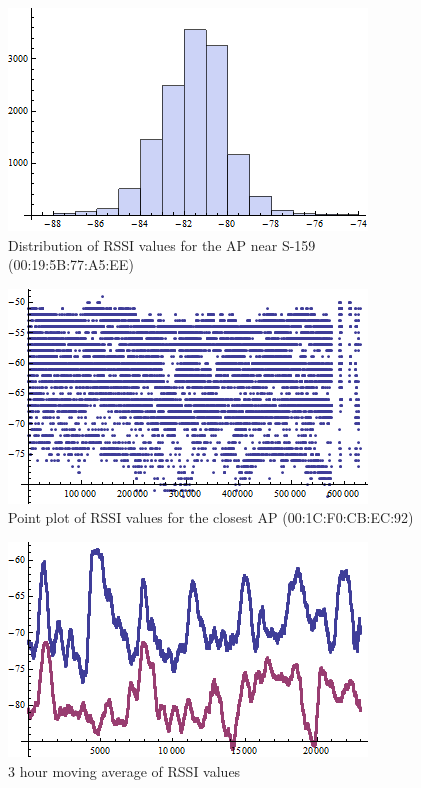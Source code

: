 \begin{figure}\centering
    \includegraphics{figures/histogram_00_19_5B_77_A5_EE.png}
    \caption{Distribution of RSSI values for the AP near S-159 (00:19:5B:77:A5:EE) \label{fig:histogram_00_19_5B_77_A5_EE}}
\end{figure}

\begin{figure}\centering
    \includegraphics{figures/listplot_00_1C_F0_CB_EC_92.png}
    \caption{Point plot of RSSI values for the closest AP (00:1C:F0:CB:EC:92) \label{fig:listplot_00_1C_F0_CB_EC_92}}    
\end{figure}

\begin{figure}\centering
    \includegraphics{figures/moving_average.png}
    \caption{3 hour moving average of RSSI values}
\end{figure}

